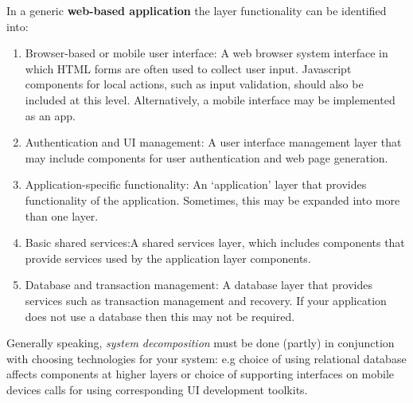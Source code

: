 \documentclass[10pt,a4paper]{report}
\begin{document}
In a generic \textbf{web-based application} the layer functionality can be identified into:
\begin{enumerate}
	\item Browser-based or mobile user interface: A web browser system interface in which HTML forms are often used to collect user input. Javascript components for local actions, such as input validation, should also be included at this level. Alternatively, a mobile interface may be implemented as an
	app.
	
	\item Authentication and UI management: A user interface management layer that may include components for user
	authentication and web page generation.
	
	\item Application-specific functionality: An ‘application’ layer that provides functionality of the application. Sometimes, this may be expanded into more than one layer.
	
	\item Basic shared services:A shared services layer, which includes components that provide services used by the application layer components.
	
	\item Database and transaction management: A database layer that provides services such as transaction management and recovery. If your application does not use a database then this may not be required.
\end{enumerate}

Generally speaking, \textit{system decomposition} must be done (partly) in conjunction with
choosing technologies for your system: e.g choice of using relational database affects components at higher layers or choice of supporting interfaces on mobile devices calls for using corresponding UI
development toolkits.
\end{document}
